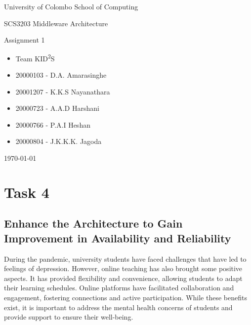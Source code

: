 \documentclass[12pt]{article}
\newcommand{\courseUniversity}{University of Colombo School of Computing}
\newcommand{\courseName}{SCS3203 Middleware Architecture}
\newcommand{\assignmentTitle}{Assignment 1}
\newcommand{\studentInfo}{
\begin{itemize}[label={}, noitemsep]
\item \hspace{5cm} Team KID\textsuperscript{2}S
\vspace*{0.5cm}
\item \hspace{3cm} 20000103 - D.A. Amarasinghe 
\item \hspace{3cm} 20001207 - K.K.S Nayanathara
\item \hspace{3cm} 20000723 - A.A.D Harshani
\item \hspace{3cm} 20000766 - P.A.I Heshan
\item \hspace{3cm} 20000804 - J.K.K.K. Jagoda
\end{itemize}
}
\begin{document}
\begin{titlepage}
    \centering
    \vspace*{1cm}
    {\LARGE \courseUniversity \par}
    \vspace{1.5cm}
    {\Large \courseName \par}
    \vspace{1cm}
    {\Large \assignmentTitle \par}
    \vspace{2cm}
    {\large \studentInfo \par}
    \vfill
    {\large \today \par}
\end{titlepage}

\setcounter{page}{1}

\section*{Task 4}

\subsection*{Enhance the Architecture to Gain Improvement in Availability and Reliability\\}

During the pandemic, university students have faced challenges that have led to feelings of
depression. However, online teaching has also brought some positive aspects. It has provided
flexibility and convenience, allowing students to adapt their learning schedules. Online platforms
have facilitated collaboration and engagement, fostering connections and active participation.
While these benefits exist, it is important to address the mental health concerns of students and
provide support to ensure their well-being.\\
\end{document}
